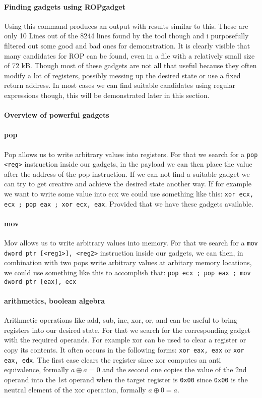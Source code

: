 \documentclass[journal=tosc,submission]{iacrtrans}
\begin{document}
\paragraph{Finding gadgets using ROPgadget}
Using this command produces an output with results similar to this.
These are only 10 Lines out of the 8244 lines found by the tool though and i purposefully filtered out some good and bad ones for demonstration. It is clearly visible that many candidates for ROP can be found, even in a file with a relatively small size of 72 kB. Though most of these gadgets are not all that useful because they often modify a lot of registers, possibly messing up the desired state or use a fixed return address. In most cases we can find suitable candidates using regular expressions though, this will be demonstrated later in this section.
\paragraph{Overview of powerful gadgets}
\paragraph{pop}
Pop allows us to write arbitrary values into registers. For that we search for a \Verb+pop <reg>+ instruction inside our gadgets, in the payload we can then place the value after the address of the pop instruction. If we can not find a suitable gadget we can try to get creative and achieve the desired state another way. If for example we want to write some value into ecx we could use something like this: \Verb+xor ecx, ecx ; pop eax ; xor ecx, eax+. Provided that we have these gadgets available.
\paragraph{mov}
Mov allows us to write arbitrary values into memory. For that we search for a \Verb+mov dword ptr [<reg1>], <reg2>+ instruction inside our gadgets, we can then, in combination with two pops write arbitrary values at arbitary memory locations, we could use something like this to accomplish that: \Verb+pop ecx ; pop eax ; mov dword ptr [eax], ecx+
\paragraph{arithmetics, boolean algebra}
Arithmetic operations like add, sub, inc, xor, or, and can be useful to bring registers into our desired state. For that we search for the corresponding gadget with the required operands. For example xor can be used to clear a register or copy its contents. It often occurs in the following forms: \Verb+xor eax, eax+ or \Verb+xor eax, edx+. The first case clears the register since xor computes an anti equivalence, formally $a \oplus a = 0$ and the second one copies the value of the 2nd operand into the 1st operand when the target register is \Verb+0x00+ since \Verb+0x00+ is the neutral element of the xor operation, formally $a \oplus 0 = a$.
\end{document}
